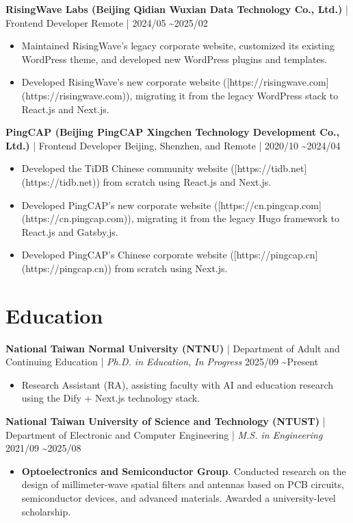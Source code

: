 \documentclass{resume}
\newcommand{\iconsection}[2]{
  \section[\texorpdfstring{#2}{#2}]{\faIcon{#1}\quad #2}
}
\begin{document}
  \datedsubsection
  {\textbf{RisingWave Labs (Beijing Qidian Wuxian Data Technology Co., Ltd.)} | Frontend Developer}
  {Remote | 2024/05 \textasciitilde 2025/02}
  \begin{itemize}
    \item Maintained RisingWave's legacy corporate website, customized its existing WordPress theme, and developed new WordPress plugins and templates.
    \item Developed RisingWave's new corporate website ([https://risingwave.com](https://risingwave.com)), migrating it from the legacy WordPress stack to React.js and Next.js.
  \end{itemize}

  \datedsubsection
  {\textbf{PingCAP (Beijing PingCAP Xingchen Technology Development Co., Ltd.)} | Frontend Developer}
  {Beijing, Shenzhen, and Remote | 2020/10 \textasciitilde 2024/04}
  \begin{itemize}
    \item Developed the TiDB Chinese community website ([https://tidb.net](https://tidb.net)) from scratch using React.js and Next.js.
    \item Developed PingCAP's new corporate website ([https://cn.pingcap.com](https://cn.pingcap.com)), migrating it from the legacy Hugo framework to React.js and Gatsby.js.
    \item Developed PingCAP's Chinese corporate website ([https://pingcap.cn](https://pingcap.cn)) from scratch using Next.js.
  \end{itemize}

  \iconsection{graduation-cap}{Education}

  \datedsubsection
  {\textbf{National Taiwan Normal University (NTNU)} | Department of Adult and Continuing Education | \textit{Ph.D. in Education, In Progress}}
  {2025/09 \textasciitilde Present}
  \begin{itemize}
    \item Research Assistant (RA), assisting faculty with AI and education research using the Dify + Next.js technology stack.
  \end{itemize}

  \datedsubsection
  {\textbf{National Taiwan University of Science and Technology (NTUST)} | Department of Electronic and Computer Engineering | \textit{M.S. in Engineering}}
  {2021/09 \textasciitilde 2025/08}
  \begin{itemize}
    \item \textbf{Optoelectronics and Semiconductor Group}. Conducted research on the design of millimeter-wave spatial filters and antennas based on PCB circuits, semiconductor devices, and advanced materials. Awarded a university-level scholarship.
  \end{itemize}
\end{document}
